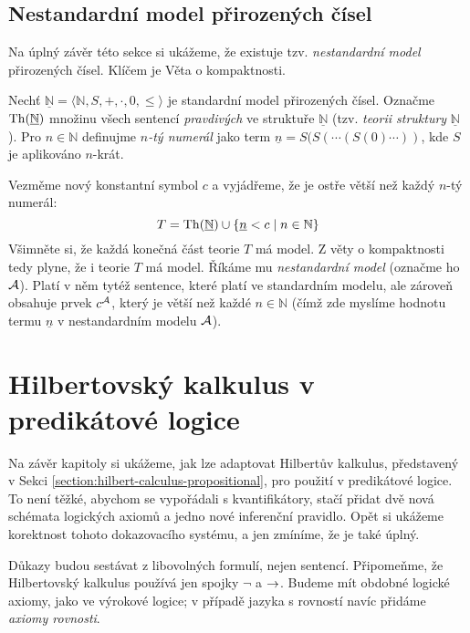 \subsection{Nestandardní model přirozených čísel}

Na úplný závěr této sekce si ukážeme, že existuje tzv. \emph{nestandardní model} přirozených čísel. Klíčem je Věta o kompaktnosti.
    
Nechť $\underline{\mathbb N}=\langle\mathbb N,S,+,\cdot,0,\leq\rangle$ je standardní model přirozených čísel. Označme $\operatorname{Th}(\underline{\mathbb N})$ množinu všech sentencí \emph{pravdivých} ve struktuře $\underline{\mathbb N}$ (tzv. \emph{teorii struktury} $\underline{\mathbb N}$). Pro $n\in \mathbb N$ definujme \emph{$n$-tý numerál} jako term $\underline n=S(S(\cdots (S(0)\cdots))$, kde $S$ je aplikováno $n$-krát.

Vezměme nový konstantní symbol $c$ a vyjádřeme, že je ostře větší než každý $n$-tý numerál:
$$
T=\operatorname{Th}(\underline{\mathbb N})\cup\{\underline n<c\mid n\in \mathbb N\}
$$
Všimněte si, že každá konečná část teorie $T$ má model. Z věty o kompaktnosti tedy plyne, že i teorie $T$ má model. Říkáme mu \emph{nestandardní model} (označme ho $\mathcal{A}$). Platí v něm tytéž sentence, které platí ve standardním modelu, ale zároveň obsahuje prvek $c^{\mathcal{A}}$, který je větší než každé $n\in \mathbb N$ (čímž zde myslíme hodnotu termu $\underline n$ v nestandardním modelu $\mathcal{A}$).
    

\section{Hilbertovský kalkulus v predikátové logice}

Na závěr kapitoly si ukážeme, jak lze adaptovat Hilbertův kalkulus, představený v Sekci \ref{section:hilbert-calculus-propositional}, pro použití v predikátové logice. To není těžké, abychom se vypořádali s kvantifikátory, stačí přidat dvě nová schémata logických axiomů a jedno nové inferenční pravidlo. Opět si ukážeme korektnost tohoto dokazovacího systému, a jen zmíníme, že je také úplný.

Důkazy budou sestávat z libovolných formulí, nejen sentencí. Připomeňme, že Hilbertovský kalkulus používá jen spojky $\neg$ a ${\mathbin{\rightarrow}}$. Budeme mít obdobné logické axiomy, jako ve výrokové logice; v případě jazyka s rovností navíc přidáme \emph{axiomy rovnosti}. 

